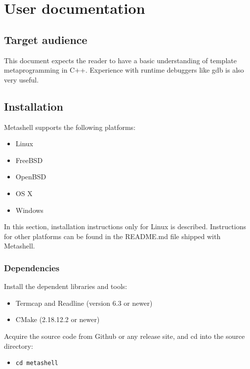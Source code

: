 

\chapter{User documentation}

\section{Target audience}

This document expects the reader to have a basic understanding of template
metaprogramming in C++.
\cite{using-cpp-metaprograms}
\cite{generative-programming}
\cite{functional-programming-cefp}
Experience with runtime debuggers like gdb\cite{gdb} is also very useful.

\section{Installation}

Metashell supports the following platforms:
\begin{itemize}
    \item Linux
    \item FreeBSD
    \item OpenBSD
    \item OS X
    \item Windows
\end{itemize}

In this section, installation instructions only for Linux is described.
Instructions for other platforms can be found in the README.md file shipped
with Metashell.

\subsection{Dependencies}

Install the dependent libraries and tools:

\begin{itemize}
    \item Termcap and Readline\cite{readline} (version 6.3 or newer)
    \item CMake\cite{cmake} (2.18.12.2 or newer)
\end{itemize}

Acquire the source code from Github\cite{github} or any release site, and cd
into the source directory:

\begin{itemize}
    \item \texttt{cd metashell}
\end{itemize}

